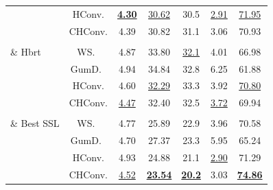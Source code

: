 \begin{table}[h!]
\begin{tabular}{lcccccc}
& HConv.		& \underline{\textbf{4.30}} & \underline{30.62} & 30.5 & \underline{2.91} & \underline{71.95} \\
& CHConv.		& 4.39 &  30.82 & 31.1 & 3.06 & 70.93 \\
\hline
\multirowcell{ 4}{D2v  \\ \& Hbrt }
& WS.~\cite{chiu24_sinica}			& 4.87 & 33.80 & \underline{32.1} & 4.01 & 66.98 \\
& GumD.~\cite{chiu24_sinica}	        & 4.94 & 34.84 & 32.8 & 6.25 & 61.88 \\
& HConv.		& 4.60 & \underline{32.29} & 33.3 & 3.92 & \underline{70.80} \\
& CHConv.		& \underline{4.47} & 32.40 & 32.5 & \underline{3.72} & 69.94 \\



\hline
\multirowcell{ 4}{Whspr  \\ \& Best SSL }
& WS.~\cite{chiu24_sinica}			& 4.77 & 25.89 & 22.9 & 3.96 & 70.58 \\
& GumD.~\cite{chiu24_sinica}	        & 4.70 & 27.37 & 23.3 & 5.95 & 65.24 \\
& HConv.		& 4.93 & 24.88 & 21.1 & \underline{2.90} & 71.29 \\
& CHConv.		& \underline{4.52} & \underline{\textbf{23.54}} & \underline{\textbf{20.2}} & 3.03 & \underline{\textbf{74.86}} \\




\end{tabular}
\end{table}
